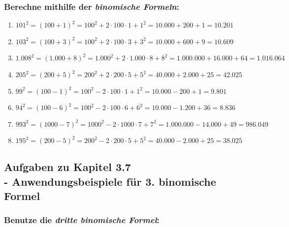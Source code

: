 \documentclass[a4paper,10pt]{article} %
\begin{document}
\subsubsection{Berechne mithilfe der \textit{binomische Formeln}:} %

\begin{enumerate}[label=\alph*)]

  \item \({101}^2 =
    {(100 + 1)}^2 =
    100^2 + 2 \cdot 100 \cdot 1 + 1^2 =
    10.000 + 200 + 1 =
    \mathbf{10.201}\) %

  \item \({103}^2 =
    {(100 + 3)}^2 =
    100^2 + 2 \cdot 100 \cdot 3 + 3^2 =
    10.000 + 600 + 9 =
    \mathbf{10.609}\) %

  \item \({1.008}^2 =
    {(1.000 + 8)}^2 =
    1.000^2 + 2 \cdot 1.000 \cdot 8 + 8^2 =
    1.000.000 + 16.000 + 64 =
    \mathbf{1.016.064}\) %

  \item \({205}^2 =
    {(200 + 5)}^2 =
    200^2 + 2 \cdot 200 \cdot 5 + 5^2 =
    40.000 + 2.000 + 25 =
    \mathbf{42.025}\) %

  \item \({99}^2 =
    {(100 - 1)}^2 =
    100^2 - 2 \cdot 100 \cdot 1 + 1^2 =
    10.000 - 200 + 1 =
    \mathbf{9.801}\) %

  \item \({94}^2 =
    {(100 - 6)}^2 =
    100^2 - 2 \cdot 100 \cdot 6 + 6^2 =
    10.000 - 1.200 + 36 =
    \mathbf{8.836}\) %

  \item \({993}^2 =
    {(1000 - 7)}^2 =
    1000^2 - 2 \cdot 1000 \cdot 7 + 7^2 =
    1.000.000 - 14.000 + 49 =
    \mathbf{986.049}\) %

  \item \({195}^2 =
    {(200 - 5)}^2 =
    200^2 - 2 \cdot 200 \cdot 5 + 5^2 =
    40.000 - 2.000 + 25 =
    \mathbf{38.025}\) %

\end{enumerate}

\subsection{Aufgaben zu Kapitel 3.7 \\
  - Anwendungsbeispiele für 3. binomische Formel}

\subsubsection{Benutze die \textit{dritte binomische Formel}:} %
\end{document}
